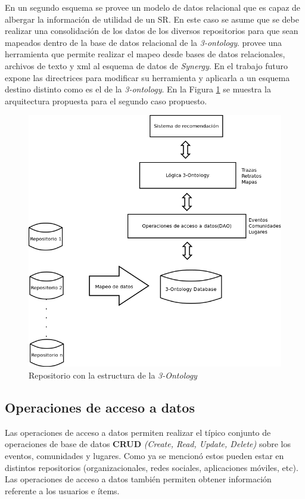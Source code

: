 En un segundo esquema se provee un modelo de datos relacional que es capaz de albergar la información de utilidad de un SR. En este caso se asume que se debe realizar una consolidación de los datos de los diversos repositorios para que sean mapeados dentro de la base de datos relacional de la \textit{3-ontology}. \cite{Molins:2012} provee una herramienta que permite realizar el mapeo desde bases de datos relacionales, archivos de texto y xml al esquema de datos de \textit{Synergy}. En el trabajo futuro expone las directrices para modificar su herramienta y aplicarla a un esquema destino distinto como es el de la \textit{3-ontology}. En la Figura  \ref{fig:unrepositorio} se muestra la arquitectura propuesta para el segundo caso propuesto.

\begin{figure}[tp]
	\centering
	\includegraphics[scale=.6]{images/3-ontology-1-repo.png}
	\caption{Repositorio con la estructura de la \textit{3-Ontology}}
	\label{fig:unrepositorio}
\end{figure}


\subsection{Operaciones de acceso a datos}

Las operaciones de acceso a datos permiten realizar el típico conjunto de operaciones de base de datos \textbf{CRUD} \textit{(Create, Read, Update, Delete)} sobre los eventos, comunidades y lugares. Como ya se mencionó estos pueden estar en distintos repositorios (organizacionales, redes sociales, aplicaciones móviles, etc). Las operaciones de acceso a datos también  permiten obtener información referente a los usuarios e ítems.

